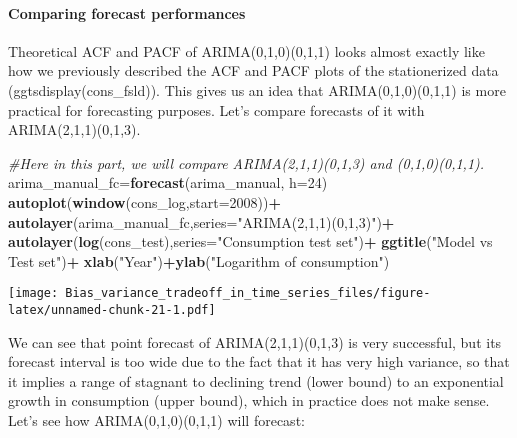 \documentclass[
]{article}
\newenvironment{Shaded}{\begin{snugshade}}{\end{snugshade}}
\newcommand{\CommentTok}[1]{\textcolor[rgb]{0.56,0.35,0.01}{\textit{#1}}}
\newcommand{\DataTypeTok}[1]{\textcolor[rgb]{0.13,0.29,0.53}{#1}}
\newcommand{\DecValTok}[1]{\textcolor[rgb]{0.00,0.00,0.81}{#1}}
\newcommand{\KeywordTok}[1]{\textcolor[rgb]{0.13,0.29,0.53}{\textbf{#1}}}
\newcommand{\NormalTok}[1]{#1}
\newcommand{\OperatorTok}[1]{\textcolor[rgb]{0.81,0.36,0.00}{\textbf{#1}}}
\newcommand{\StringTok}[1]{\textcolor[rgb]{0.31,0.60,0.02}{#1}}
\begin{document}
\hypertarget{comparing-forecast-performances}{%
\paragraph{Comparing forecast
performances}\label{comparing-forecast-performances}}

Theoretical ACF and PACF of ARIMA(0,1,0)(0,1,1) looks almost exactly
like how we previously described the ACF and PACF plots of the
stationerized data (ggtsdisplay(cons\_fsld)). This gives us an idea that
ARIMA(0,1,0)(0,1,1) is more practical for forecasting purposes. Let's
compare forecasts of it with ARIMA(2,1,1)(0,1,3).

\begin{Shaded}
\begin{Highlighting}[]
\CommentTok{#Here in this part, we will compare ARIMA(2,1,1)(0,1,3) and (0,1,0)(0,1,1).}
\NormalTok{arima_manual_fc=}\KeywordTok{forecast}\NormalTok{(arima_manual, }\DataTypeTok{h=}\DecValTok{24}\NormalTok{)}
\KeywordTok{autoplot}\NormalTok{(}\KeywordTok{window}\NormalTok{(cons_log,}\DataTypeTok{start=}\DecValTok{2008}\NormalTok{))}\OperatorTok{+}
\StringTok{  }\KeywordTok{autolayer}\NormalTok{(arima_manual_fc,}\DataTypeTok{series=}\StringTok{"ARIMA(2,1,1)(0,1,3)"}\NormalTok{)}\OperatorTok{+}
\StringTok{  }\KeywordTok{autolayer}\NormalTok{(}\KeywordTok{log}\NormalTok{(cons_test),}\DataTypeTok{series=}\StringTok{"Consumption test set"}\NormalTok{)}\OperatorTok{+}
\StringTok{  }\KeywordTok{ggtitle}\NormalTok{(}\StringTok{"Model vs Test set"}\NormalTok{)}\OperatorTok{+}
\StringTok{  }\KeywordTok{xlab}\NormalTok{(}\StringTok{"Year"}\NormalTok{)}\OperatorTok{+}\KeywordTok{ylab}\NormalTok{(}\StringTok{"Logarithm of consumption"}\NormalTok{)}
\end{Highlighting}
\end{Shaded}

\texttt{[image: Bias\_variance\_tradeoff\_in\_time\_series\_files/figure-latex/unnamed-chunk-21-1.pdf]}

We can see that point forecast of ARIMA(2,1,1)(0,1,3) is very
successful, but its forecast interval is too wide due to the fact that
it has very high variance, so that it implies a range of stagnant to
declining trend (lower bound) to an exponential growth in consumption
(upper bound), which in practice does not make sense. Let's see how
ARIMA(0,1,0)(0,1,1) will forecast:
\end{document}
